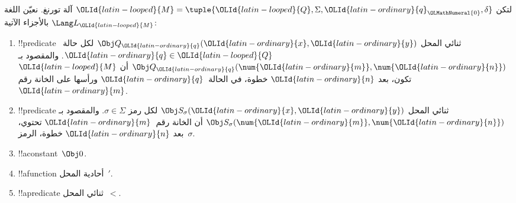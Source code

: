 \documentclass[../../../include/open-logic-section]{subfiles}
\begin{document}
\begin{defn}
لتكن ${\OLId{latin-looped}{M}}=\tuple{{\OLId{latin-looped}{Q}},\Sigma,{\OLId{latin-ordinary}{q}}_{\OLMathNumeral{0}},\delta}$ آلة تورنغ. نعيّن اللغة
$\Lang L_{\OLId{latin-looped}{M}}$ بالأجزاء الآتية:
\begin{enumerate}
\item !!{predicate} ثنائي المحل $ \Obj Q_{\OLId{latin-ordinary}{q}}({\OLId{latin-ordinary}{x}},{\OLId{latin-ordinary}{y}})$ لكل حالة~${\OLId{latin-ordinary}{q}}\in {\OLId{latin-looped}{Q}}$.
  والمقصود بـ$\Obj Q_{\OLId{latin-ordinary}{q}}(\num{{\OLId{latin-ordinary}{m}}},\num{{\OLId{latin-ordinary}{n}}})$ أن ${\OLId{latin-looped}{M}}$ تكون، بعد ${\OLId{latin-ordinary}{n}}$
  خطوة، في الحالة~${\OLId{latin-ordinary}{q}}$ ورأسها على الخانة رقم~${\OLId{latin-ordinary}{m}}$.
\item !!{predicate} ثنائي المحل $\Obj S_\sigma({\OLId{latin-ordinary}{x}},{\OLId{latin-ordinary}{y}})$ لكل رمز
  $\sigma\in\Sigma$. والمقصود بـ$\Obj S_\sigma(\num{{\OLId{latin-ordinary}{m}}},\num{{\OLId{latin-ordinary}{n}}})$
  أن الخانة رقم~${\OLId{latin-ordinary}{m}}$ تحتوي، بعد ${\OLId{latin-ordinary}{n}}$ خطوة، الرمز~$\sigma$.
\item !!a{constant}~$\Obj 0$.
\item !!a{function} أحادية المحل~$\prime$.
\item !!a{predicate} ثنائي المحل~$<$.
\end{enumerate}
\end{defn}
\end{document}
